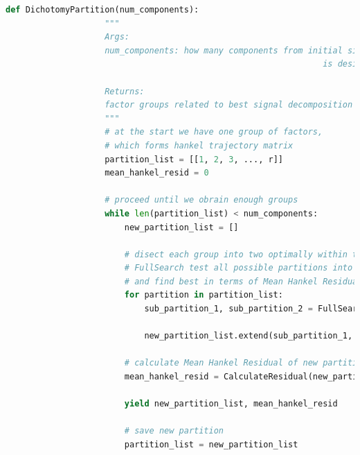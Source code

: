 	    	\begin{lstlisting}[language=Python, caption={Псевдокод процедуры рекурсивного получения декомпозиции временного ряда},]
	    		def DichotomyPartition(num_components):
	    			"""
	    			Args:
	    			num_components: how many components from initial signal
	    							 							is desired 
		    		
	    			Returns:
	    			factor groups related to best signal decomposition
	    			"""
	    			# at the start we have one group of factors,
	    			# which forms hankel trajectory matrix
	    			partition_list = [[1, 2, 3, ..., r]]
	    			mean_hankel_resid = 0
	    			
	    			# proceed until we obrain enough groups
	    			while len(partition_list) < num_components:
	    				new_partition_list = []
	    		
	    				# disect each group into two optimally within this group
	    				# FullSearch test all possible partitions into 2 groups
	    				# and find best in terms of Mean Hankel Residual
	    				for partition in partition_list:
	    					sub_partition_1, sub_partition_2 = FullSearch(partition)
	    		
	    					new_partition_list.extend(sub_partition_1, sub_partition_2)
	    		
	    				# calculate Mean Hankel Residual of new partition 
	    				mean_hankel_resid = CalculateResidual(new_partition_list)
	    				
	    				yield new_partition_list, mean_hankel_resid
	    				
	    				# save new partition
	    				partition_list = new_partition_list    		
	    	\end{lstlisting}
	    	
